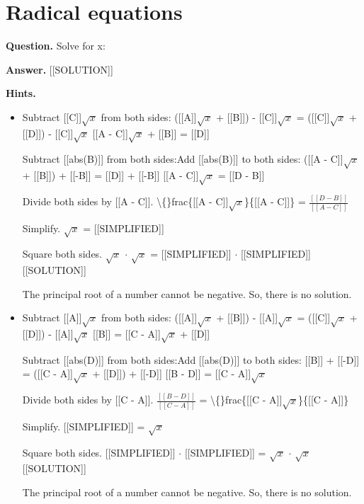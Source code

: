 \documentclass{article}
\begin{document}
\section*{Radical equations}
\textbf{Question.} Solve for x:

\textbf{Answer.} [[SOLUTION]]

\textbf{Hints.}
\begin{itemize}
  \item Subtract [[C]]$\sqrt{x}$ from both sides:
                    ([[A]]$\sqrt{x}$ + [[B]]) - [[C]]$\sqrt{x}$ = ([[C]]$\sqrt{x}$ + [[D]]) - [[C]]$\sqrt{x}$
                    [[A - C]]$\sqrt{x}$ + [[B]] = [[D]]
                
                
                    Subtract [[abs(B)]] from both sides:Add [[abs(B)]] to both sides:
                    ([[A - C]]$\sqrt{x}$ + [[B]]) + [[-B]] = [[D]] + [[-B]]
                    [[A - C]]$\sqrt{x}$ = [[D - B]]
                
                
                    Divide both sides by [[A - C]].
                    \textbackslash\{\}frac\{[[A - C]]$\sqrt{x}$\}\{[[A - C]]\} = $\frac{[[D - B]]}{[[A - C]]}$
                
                
                    Simplify.
                    $\sqrt{x}$ = [[SIMPLIFIED]]
                
                
                    Square both sides.
                    $\sqrt{x}$ $\cdot$ $\sqrt{x}$ = [[SIMPLIFIED]] $\cdot$ [[SIMPLIFIED]]
                    [[SOLUTION]]
                
                
                    The principal root of a number cannot be negative. So, there is no solution.
  \item Subtract [[A]]$\sqrt{x}$ from both sides:
                    ([[A]]$\sqrt{x}$ + [[B]]) - [[A]]$\sqrt{x}$ = ([[C]]$\sqrt{x}$ + [[D]]) - [[A]]$\sqrt{x}$
                    [[B]] = [[C - A]]$\sqrt{x}$ + [[D]]
                
                
                    Subtract [[abs(D)]] from both sides:Add [[abs(D)]] to both sides:
                    [[B]] + [[-D]] = ([[C - A]]$\sqrt{x}$ + [[D]]) + [[-D]]
                    [[B - D]] = [[C - A]]$\sqrt{x}$
                
                
                    Divide both sides by [[C - A]].
                    $\frac{[[B - D]]}{[[C - A]]}$ = \textbackslash\{\}frac\{[[C - A]]$\sqrt{x}$\}\{[[C - A]]\}
                
                
                    Simplify.
                    [[SIMPLIFIED]] = $\sqrt{x}$
                
                
                    Square both sides.
                    [[SIMPLIFIED]] $\cdot$ [[SIMPLIFIED]] = $\sqrt{x}$ $\cdot$ $\sqrt{x}$
                    [[SOLUTION]]
                
                
                    The principal root of a number cannot be negative. So, there is no solution.
\end{itemize}
\end{document}

